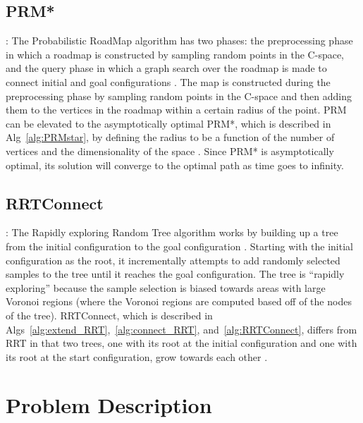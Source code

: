 \documentclass[12pt]{article}
\begin{document}
\subsection{PRM*}: The Probabilistic RoadMap algorithm has two phases: the preprocessing phase in which a roadmap is constructed by sampling random points in the C-space, and the query phase in which a graph search over the roadmap is made to connect initial and goal configurations \cite{kavraki1996prm}. The map is constructed during the preprocessing phase by sampling random points in the C-space and then adding them to the vertices in the roadmap within a certain radius of the point. PRM can be elevated to the asymptotically optimal PRM*, which is described in Alg~\ref{alg:PRMstar}, by defining the radius to be a function of the number of vertices and the dimensionality of the space \cite{karaman2011sampling}. Since PRM* is asymptotically optimal, its solution will converge to the optimal path as time goes to infinity.

\subsection{RRTConnect}: The Rapidly exploring Random Tree algorithm works by building up a tree from the initial configuration to the goal configuration \cite{lavalle1998rrt}. Starting with the initial configuration as the root, it incrementally attempts to add randomly selected samples to the tree until it reaches the goal configuration. The tree is ``rapidly exploring'' because the sample selection is biased towards areas with large Voronoi regions (where the Voronoi regions are computed based off of the nodes of the tree). RRTConnect, which is described in Algs~\ref{alg:extend_RRT},~\ref{alg:connect_RRT}, and~\ref{alg:RRTConnect}, differs from RRT in that two trees, one with its root at the initial configuration and one with its root at the start configuration, grow towards each other \cite{kuffner2000rrt}.

\section{Problem Description}
\end{document}
